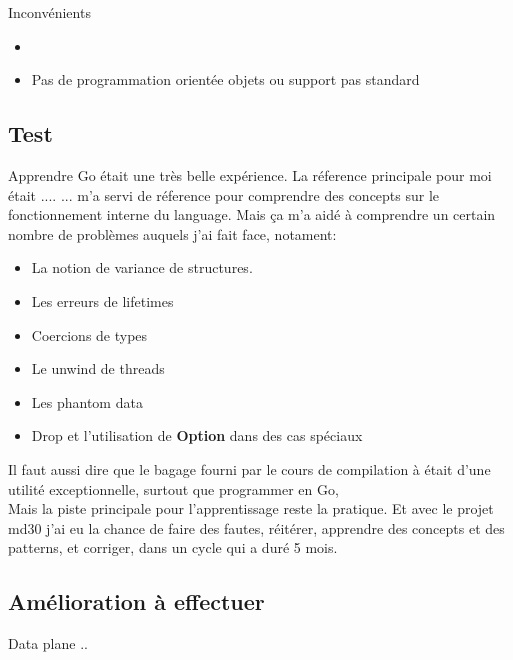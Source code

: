         {Inconvénients}
            \begin{itemize}
                \renewcommand{\labelitemi}{$\bullet$}
                \item 
                \item Pas de programmation orientée objets ou support pas standard
            \end{itemize}

    \subsection{Test }
        Apprendre Go était une très belle expérience. La réference principale
        pour moi était .... 
       ... m'a servi de réference pour
        comprendre des concepts sur le fonctionnement interne du language.
     Mais ça m'a aidé à
        comprendre un certain nombre de problèmes auquels j'ai fait face, notament:
        \begin{itemize}
            \renewcommand{\labelitemi}{$\bullet$}
            \item La notion de variance de structures\cite{variance_wiki}.
            \item Les erreurs de lifetimes
            \item Coercions de types
            \item Le unwind de threads
            \item Les phantom data
            \item Drop et l'utilisation de \textbf{Option} dans des cas spéciaux
        \end{itemize}
        \bigskip
        Il faut aussi dire que le bagage fourni par le cours de compilation à
        \establishment{} était d'une utilité exceptionnelle, surtout que
        programmer en Go, \\[0.3cm]
        Mais la piste principale pour l'apprentissage reste la pratique. Et avec
        le projet \gls{md30} j'ai eu la chance de faire des fautes, réitérer,
        apprendre des concepts et des patterns, et corriger, dans un cycle qui a
        duré 5 mois. 

    \subsection{Amélioration à effectuer}
        Data plane .. 
        